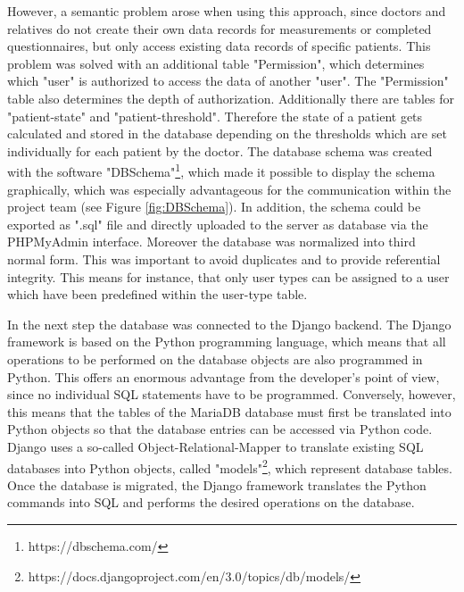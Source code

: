 However, a semantic problem arose when using this approach, since doctors and relatives do not create their own data records for measurements or completed questionnaires, but only access existing data records of specific patients. This problem was solved with an additional table "Permission", which determines which "user" is authorized to access the data of another "user". The "Permission" table also determines the depth of authorization. Additionally there are tables for "patient-state" and "patient-threshold". Therefore the state of a patient gets calculated and stored in the database depending on the thresholds which are set individually for each patient by the doctor. The database schema was created with the software "DBSchema"\footnote{https://dbschema.com/}, which made it possible to display the schema graphically, which was especially advantageous for the communication within the project team (see Figure \ref{fig:DBSchema}). In addition, the schema could be exported as ".sql" file and directly uploaded to the server as database via the PHPMyAdmin interface. Moreover the database was normalized into third normal form. This was important to avoid duplicates and to provide referential integrity. This means for instance, that only user types can be assigned to a user which have been predefined within the user-type table.


In the next step the database was connected to the Django backend. The Django framework is based on the Python programming language, which means that all operations to be performed on the database objects are also programmed in Python. This offers an enormous advantage from the developer's point of view, since no individual SQL statements have to be programmed. Conversely, however, this means that the tables of the MariaDB database must first be translated into Python objects so that the database entries can be accessed via Python code. Django uses a so-called \glqq{}Object-Relational-Mapper\grqq{} to translate existing SQL databases into Python objects, called "models"\footnote{https://docs.djangoproject.com/en/3.0/topics/db/models/}, which represent database tables. Once the database is migrated, the Django framework translates the Python commands into SQL and performs the desired operations on the database. 

